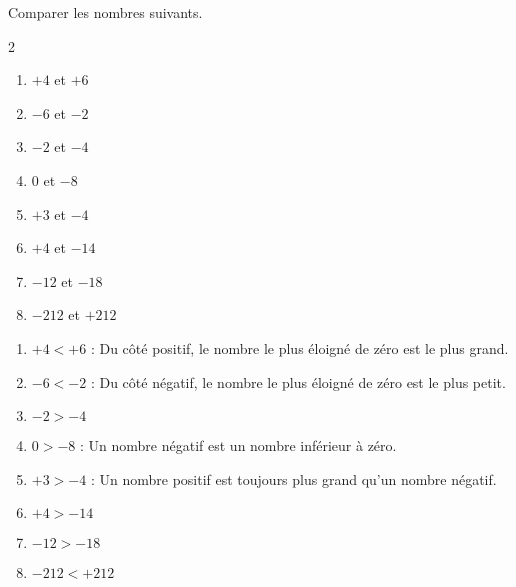 \begin{exercice*}
    Comparer les nombres suivants.
    \begin{multicols}2
        \begin{enumerate}
            \item $+4$ et $+6$
            \item $-6$ et $-2$
            \item $-2$ et $-4$
            \item $0$ et $-8$
            \item $+3$ et $-4$
            \item $+4$ et $-14$
            \item $-12$ et $-18$
            \item $-212$ et $+212$
        \end{enumerate}
    \end{multicols}
\end{exercice*}
\begin{corrige}
    \begin{enumerate}
        \item $+4<+6$ : Du côté positif, le nombre le plus éloigné de zéro est le plus grand.
        \item $-6<-2$ : Du côté négatif, le nombre le plus éloigné de zéro est le plus petit.
        \item $-2>-4$
        \item $0>-8$ : Un nombre négatif est un nombre inférieur à zéro.
        \item $+3>-4$ : Un nombre positif est toujours plus grand qu'un nombre négatif.
        \item $+4>-14$
        \item $-12>-18$
        \item $-212<+212$
    \end{enumerate}    
\end{corrige}

